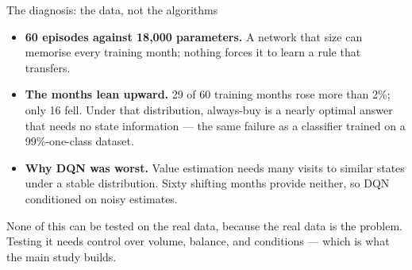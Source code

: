 \documentclass[aspectratio=169,11pt]{beamer}
\begin{document}
\begin{frame}{The diagnosis: the data, not the algorithms}
  \begin{itemize}
    \item \textbf{60 episodes against 18,000 parameters.} A network
      that size can memorise every training month; nothing forces it to
      learn a rule that transfers.
    \item \textbf{The months lean upward.} 29 of 60 training months
      rose more than 2\%; only 16 fell. Under that distribution,
      always-buy is a nearly optimal answer that needs no state
      information --- the same failure as a classifier trained on a
      99\%-one-class dataset.
    \item \textbf{Why DQN was worst.} Value estimation needs many
      visits to similar states under a stable distribution. Sixty
      shifting months provide neither, so DQN conditioned on noisy
      estimates.
  \end{itemize}
  \vspace{4pt}
  None of this can be tested on the real data, because the real data is
  the problem. Testing it needs control over volume, balance, and
  conditions --- which is what the main study builds.
\end{frame}
\end{document}
